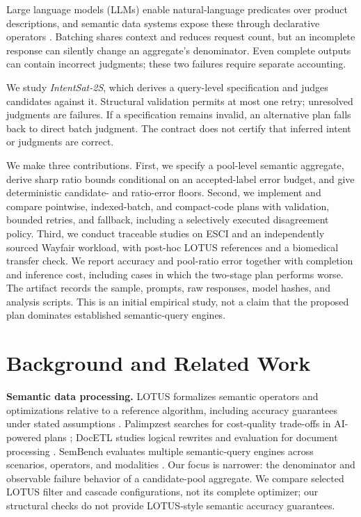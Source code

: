 \documentclass[conference]{IEEEtran}
\begin{document}
Large language models (LLMs) enable natural-language predicates over product descriptions, and semantic data systems expose these through declarative operators \cite{lotus,docetl,palimpzest}. Batching shares context and reduces request count, but an incomplete response can silently change an aggregate's denominator. Even complete outputs can contain incorrect judgments; these two failures require separate accounting.

We study \emph{IntentSat-2S}, which derives a query-level specification and judges candidates against it. Structural validation permits at most one retry; unresolved judgments are failures. If a specification remains invalid, an alternative plan falls back to direct batch judgment. The contract does not certify that inferred intent or judgments are correct.

We make three contributions. First, we specify a pool-level semantic aggregate, derive sharp ratio bounds conditional on an accepted-label error budget, and give deterministic candidate- and ratio-error floors. Second, we implement and compare pointwise, indexed-batch, and compact-code plans with validation, bounded retries, and fallback, including a selectively executed disagreement policy. Third, we conduct traceable studies on ESCI and an independently sourced Wayfair workload, with post-hoc LOTUS references and a biomedical transfer check. We report accuracy and pool-ratio error together with completion and inference cost, including cases in which the two-stage plan performs worse. The artifact records the sample, prompts, raw responses, model hashes, and analysis scripts. This is an initial empirical study, not a claim that the proposed plan dominates established semantic-query engines.

\section{Background and Related Work}
\textbf{Semantic data processing.} LOTUS formalizes semantic operators and optimizations relative to a reference algorithm, including accuracy guarantees under stated assumptions \cite{lotus}. Palimpzest searches for cost-quality trade-offs in AI-powered plans \cite{palimpzest}; DocETL studies logical rewrites and evaluation for document processing \cite{docetl}. SemBench evaluates multiple semantic-query engines across scenarios, operators, and modalities \cite{sembench}. Our focus is narrower: the denominator and observable failure behavior of a candidate-pool aggregate. We compare selected LOTUS filter and cascade configurations, not its complete optimizer; our structural checks do not provide LOTUS-style semantic accuracy guarantees.
\end{document}
